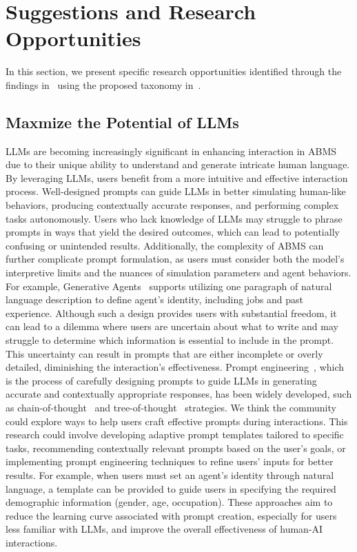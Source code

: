 \section{Suggestions and Research Opportunities}
In this section, we present specific research opportunities identified through the findings in~ using the proposed taxonomy in~.

\subsection{Maxmize the Potential of LLMs}
LLMs are becoming increasingly significant in enhancing interaction in ABMS due to their unique ability to understand and generate intricate human language.
By leveraging LLMs, users benefit from a more intuitive and effective interaction process.
Well-designed prompts can guide LLMs in better simulating human-like behaviors, producing contextually accurate responses, and performing complex tasks autonomously.
Users who lack knowledge of LLMs may struggle to phrase prompts in ways that yield the desired outcomes, which can lead to potentially confusing or unintended results.
Additionally, the complexity of ABMS can further complicate prompt formulation, as users must consider both the model's interpretive limits and the nuances of simulation parameters and agent behaviors.
For example, Generative Agents~\cite{10.1145/3586183.3606763} supports utilizing one paragraph of natural language description to define agent’s identity, including jobs and past experience.
Although such a design provides users with substantial freedom, it can lead to a dilemma where users are uncertain about what to write and may struggle to determine which information is essential to include in the prompt. 
This uncertainty can result in prompts that are either incomplete or overly detailed, diminishing the interaction's effectiveness.
Prompt engineering~\cite{giray_prompt_2023}, which is the process of carefully designing prompts to guide LLMs in generating accurate and contextually appropriate responses, has been widely developed, such as chain-of-thought~\cite{NEURIPS2022_9d560961} and tree-of-thought~\cite{NEURIPS2023_271db992} strategies.
We think the community could explore ways to help users craft effective prompts during interactions.
This research could involve developing adaptive prompt templates tailored to specific tasks, recommending contextually relevant prompts based on the user’s goals, or implementing prompt engineering techniques to refine users' inputs for better results. 
For example, when users must set an agent's identity through natural language, a template can be provided to guide users in specifying the required demographic information (\eg gender, age, occupation).
These approaches aim to reduce the learning curve associated with prompt creation, especially for users less familiar with LLMs, and improve the overall effectiveness of human-AI interactions.

